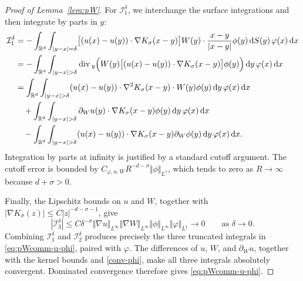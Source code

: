 \documentclass[reqno,11pt,a4paper]{amsart}
\newcommand{\R}{\ensuremath{\mathbb{R}}}
\newcommand{\dd}{\mathrm{d}}
\renewcommand{\div}{{\rm div\,}}
\begin{document}
\begin{proof}[Proof of Lemma~\ref{lem:pW}]
For $\mathcal I_1^\delta$, we interchange the surface
integrations and then integrate by parts in $y$:
\begin{align*}
  \mathcal I_1^\delta
  &=
  -\int_{\R^d}\int_{|y-x|=\delta}
  \bigl[(u(x)-u(y))\cdot\nabla K_\sigma(x-y)\bigr]
  W(y)\cdot\frac{x-y}{|x-y|}
  \phi(y)\,\dd S(y)\,\varphi(x)\,\dd x
  \\
  &=
  -\int_{\R^d}\int_{|y-x|>\delta}
  \div_y\Bigl(
    W(y)
    \bigl[(u(x)-u(y))\cdot\nabla K_\sigma(x-y)\bigr]
    \phi(y)
  \Bigr)\,\dd y\,\varphi(x)\,\dd x
  \\
  &=
  \int_{\R^d}\int_{|y-x|>\delta}
  (u(x)-u(y))\cdot\nabla^2K_\sigma(x-y)\cdot W(y)
  \phi(y)\,\dd y\,\varphi(x)\,\dd x
  \\
  &\quad+
  \int_{\R^d}\int_{|y-x|>\delta}
  \partial_Wu(y)\cdot\nabla K_\sigma(x-y)
  \phi(y)\,\dd y\,\varphi(x)\,\dd x
  \\
  &\quad-
  \int_{\R^d}\int_{|y-x|>\delta}
  (u(x)-u(y))\cdot\nabla K_\sigma(x-y)
  \partial_W\phi(y)\,\dd y\,\varphi(x)\,\dd x.
\end{align*}
Integration by parts at infinity is justified
by a standard cutoff argument.
The cutoff error is bounded by
$C_{\varphi,u,W}R^{-d-\sigma}\Vert \phi\Vert _{L^1}$,
which tends to zero as $R\to\infty$
because $d+\sigma>0$.

Finally, the Lipschitz bounds on $u$ and $W$,
together with
$|\nabla K_\sigma(z)|\leq C|z|^{-d-\sigma-1}$,
give
\[
  |\mathcal I_3^\delta|
  \leq
  C\delta^{-\sigma}
  \Vert \nabla u\Vert _{L^\infty}
  \Vert \nabla W\Vert _{L^\infty}
  \Vert \phi\Vert _{L^\infty}
  \Vert \varphi\Vert _{L^1}
  \longrightarrow0
  \qquad\text{as }\delta\rightarrow0.
\]
Combining $\mathcal I_1^\delta$ and $\mathcal I_2^\delta$
produces precisely the three truncated integrals
in \eqref{eq:pWcomm-u-phi}, paired with $\varphi$.
The differences of $u$, $W$, and $\partial_Wu$,
together with the kernel bounds and \eqref{conv-phi},
make all three integrals absolutely convergent.
Dominated convergence therefore gives
\eqref{eq:pWcomm-u-phi}.


\end{proof}
\end{document}
